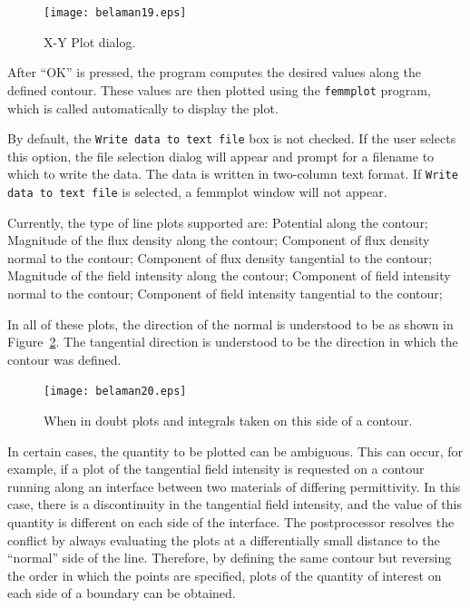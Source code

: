 \documentclass[12pt]{report}
\begin{document}
\begin{figure}[htbp]
\centerline{\texttt{[image: belaman19.eps]}}
\caption{X-Y Plot dialog.}
\label{fig19}
\end{figure}




After ``OK'' is pressed, the program computes the desired values
along the defined contour. These values are then plotted using the
\texttt{femmplot} program, which is called automatically to display
the plot.





By default, the \texttt{Write data to text file} box is not
checked. If the user selects this option, the file selection dialog
will appear and prompt for a filename to which to write the data.
The data is written in two-column text format. If \texttt{Write
data to text file} is selected, a femmplot window will not appear.





Currently, the type of line plots supported are: Potential along the
contour; Magnitude of the flux density along the contour; Component of flux
density normal to the contour; Component of flux density tangential to the
contour; Magnitude of the field intensity along the contour; Component of
field intensity normal to the contour; Component of field intensity
tangential to the contour;





In all of these plots, the direction of the normal is understood to
be as shown in Figure~\ref{fig20}. The tangential direction is
understood to be the direction in which the contour was defined.

\begin{figure}[htbp]
\centerline{\texttt{[image: belaman20.eps]}}
\caption{When in doubt plots and integrals taken on this side of a contour.}
\label{fig20}
\end{figure}




In certain cases, the quantity to be plotted can be ambiguous. This
can occur, for example, if a plot of the tangential field intensity
is requested on a contour running along an interface between two
materials of differing permittivity. In this case, there is a
discontinuity in the tangential field intensity, and the value of
this quantity is different on each side of the interface. The
postprocessor resolves the conflict by always evaluating the plots
at a differentially small distance to the ``normal'' side of the
line. Therefore, by defining the same contour but reversing the
order in which the points are specified, plots of the quantity of
interest on each side of a boundary can be obtained.
\end{document}
